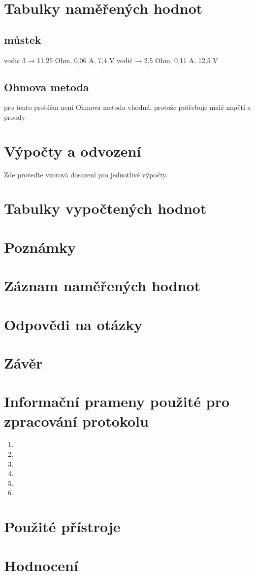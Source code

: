 \documentclass[a4]{article}
\begin{document}
\section{Tabulky naměřených hodnot}
\subsection{můstek}
vodic 3 → 11,25 Ohm, 0,06 A, 7,4 V
vodič → 2,5 Ohm, 0,11 A, 12,5 V

\subsection{Ohmova metoda}
pro tento problém není Ohmova metoda vhodná, protože potřebuje malé napětí a proudy

\section{Výpočty a odvození}
Zde proveďte vzorová dosazení pro jednotlivé výpočty.

\section{Tabulky vypočtených hodnot}


\section{Poznámky}

\section{Záznam naměřených hodnot}



\section{Odpovědi na otázky}

\section{Závěr}

\section{Informační prameny použité pro zpracování protokolu}
\begin{enumerate}
    \item {\dotfill}
    \item {\dotfill}
    \item {\dotfill}
    \item {\dotfill}
    \item {\dotfill}
    \item {\dotfill}
\end{enumerate}


\section{Použité přístroje}

\section{Hodnocení}
\end{document}
